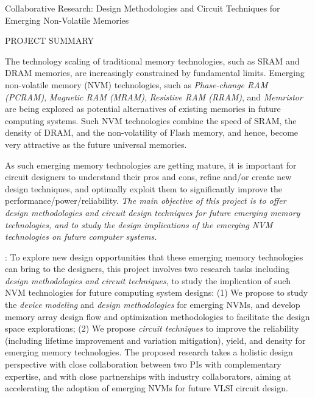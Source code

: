 \documentclass[11pt,letterpaper]{article}
\begin{document}
\begin{center}
{\Large Collaborative Research: Design Methodologies and Circuit Techniques for Emerging Non-Volatile Memories}\\
\end{center}
\begin{center}
{\large  PROJECT SUMMARY} \\
\end{center}

\normalsize
The technology scaling of traditional memory technologies, such as SRAM and DRAM memories, are increasingly constrained by fundamental limits. Emerging non-volatile memory (NVM) technologies, such as \textit{Phase-change RAM (PCRAM)}, \textit{Magnetic RAM (MRAM)},  \textit{Resistive RAM (RRAM)}, and \textit{Memristor} are being explored as potential alternatives of existing memories in future computing systems. Such NVM technologies combine the speed of SRAM, the density of DRAM, and the non-volatility of Flash memory, and hence, become very attractive as the future universal memories. 

As such emerging memory technologies are getting mature, it is important for circuit designers to understand their pros and cons, refine and/or create new design techniques, and optimally exploit them to significantly improve the performance/power/reliability. \textit{The main objective of this project is to offer design methodologies and circuit design techniques for future emerging memory technologies, and to study the design implications of the emerging NVM technologies on future computer systems.}

{}: 
To explore new design opportunities that these emerging memory technologies can bring to the designers,  this project involves two research tasks including \emph{design methodologies and circuit techniques}, to study the implication of such NVM technologies for future computing system designs: (1) We propose to study the \textit{device modeling} and \textit{design methodologies} for emerging NVMs, and develop memory array design flow and optimization methodologies to facilitate the design space explorations; (2) We propose \textit{circuit techniques} to improve the reliability (including lifetime improvement and variation mitigation), yield,
and density for emerging memory technologies. The proposed research takes a holistic design perspective with close collaboration between two PIs with complementary expertise, and with close partnerships with industry collaborators, aiming at accelerating the adoption of emerging NVMs for future VLSI circuit design.
\end{document}
